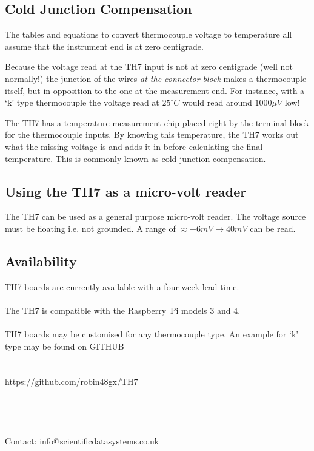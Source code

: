 \documentclass[10pt,foldmark]{leaflet}
\begin{document}
\subsection{Cold Junction Compensation}

The tables and equations to convert thermocouple voltage to
temperature all assume that the instrument end is at zero centigrade.

Because the voltage read at the TH7 input is not at zero centigrade (well not normally!)
the junction of the wires {\em at the connector block}  makes a thermocouple itself, but in opposition to
the one at the measurement end.
%
For instance, with a `k' type thermocouple
the voltage read at $25^\circ C$ would read around $1000 \mu V$ low!

The TH7 has a temperature measurement chip placed right by the terminal block for the thermocouple inputs.
By knowing this temperature, the TH7 works out what the missing voltage is
and adds it in before calculating the final temperature. This is commonly known as cold junction compensation.

\subsection{Using the TH7 as a micro-volt reader}

The TH7 can be used as a general purpose micro-volt reader.
The voltage source must be floating i.e. not grounded.
A range of $\approx -6mV \rightarrow 40mV$ can be read.
\clearpage
\subsection{Availability}

TH7 boards are currently available with a four week lead time.
\\
\\
The TH7 is compatible with the Raspberry~Pi models 3 and 4.
\\
\\
TH7 boards may be customised for any thermocouple type.
An example for `k' type may be found on GITHUB 
\\
\\
\\
https://github.com/robin48gx/TH7 
\\
\\
\\
\\
\\
Contact: info@scientificdatasystems.co.uk
\\
\\
\vspace{0.5cm}
\end{document}
